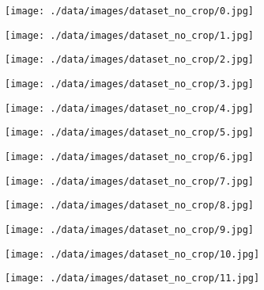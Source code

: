 \begin{figure}
	\centering
	\begin{subfigure}{0.1 \textwidth}
		\texttt{[image: ./data/images/dataset\_no\_crop/0.jpg]}
	\end{subfigure}
	\begin{subfigure}{0.1 \textwidth}
		\texttt{[image: ./data/images/dataset\_no\_crop/1.jpg]}
	\end{subfigure}
	\begin{subfigure}{0.1 \textwidth}
		\texttt{[image: ./data/images/dataset\_no\_crop/2.jpg]}
	\end{subfigure}
	\begin{subfigure}{0.1 \textwidth}
		\texttt{[image: ./data/images/dataset\_no\_crop/3.jpg]}
	\end{subfigure}
	\begin{subfigure}{0.1 \textwidth}
		\texttt{[image: ./data/images/dataset\_no\_crop/4.jpg]}
	\end{subfigure}
	\begin{subfigure}{0.1 \textwidth}
		\texttt{[image: ./data/images/dataset\_no\_crop/5.jpg]}
	\end{subfigure}
	\begin{subfigure}{0.1 \textwidth}
		\texttt{[image: ./data/images/dataset\_no\_crop/6.jpg]}
	\end{subfigure}
	\begin{subfigure}{0.1 \textwidth}
		\texttt{[image: ./data/images/dataset\_no\_crop/7.jpg]}
	\end{subfigure}
	\begin{subfigure}{0.1 \textwidth}
		\texttt{[image: ./data/images/dataset\_no\_crop/8.jpg]}
	\end{subfigure}
	\begin{subfigure}{0.1 \textwidth}
		\texttt{[image: ./data/images/dataset\_no\_crop/9.jpg]}
	\end{subfigure}
	\begin{subfigure}{0.1 \textwidth}
		\texttt{[image: ./data/images/dataset\_no\_crop/10.jpg]}
	\end{subfigure}
	\begin{subfigure}{0.1 \textwidth}
		\texttt{[image: ./data/images/dataset\_no\_crop/11.jpg]}
	\end{subfigure}
	\begin{subfigure}{0.1 \textwidth}

\end{subfigure}
\end{figure}
